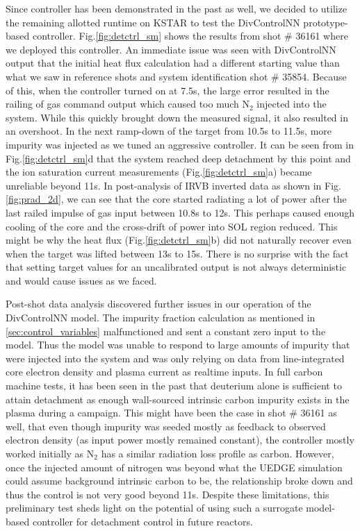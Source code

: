 Since \Afrac controller has been demonstrated in the past as well, we decided to utilize the remaining allotted runtime on KSTAR to test the DivControlNN prototype-based controller.
Fig.\ref{fig:detctrl_sm} shows the results from shot \# 36161 where we deployed this controller.
An immediate issue was seen with DivControlNN output that the initial heat flux calculation had a different starting value than what we saw in reference shots and system identification shot \# 35854.
Because of this, when the controller turned on at 7.5s, the large error resulted in the railing of gas command output which caused too much N$_2$ injected into the system.
While this quickly brought down the measured signal, it also resulted in an overshoot.
In the next ramp-down of the target from 10.5s to 11.5s, more impurity was injected as we tuned an aggressive controller.
It can be seen from \Afrac in Fig.\ref{fig:detctrl_sm}d that the system reached deep detachment by this point and the ion saturation current measurements (Fig.\ref{fig:detctrl_sm}a) became unreliable beyond 11s.
In post-analysis of IRVB inverted data as shown in Fig.\ref{fig:prad_2d}, we can see that the core started radiating a lot of power after the last railed impulse of gas input between 10.8s to 12s.
This perhaps caused enough cooling of the core and the cross-drift of power into \ac{SOL} region reduced.
This might be why the heat flux (Fig.\ref{fig:detctrl_sm}b) did not naturally recover even when the target was lifted between 13s to 15s.
There is no surprise with the fact that setting target values for an uncalibrated output is not always deterministic and would cause issues as we faced.

Post-shot data analysis discovered further issues in our operation of the DivControlNN model.
The impurity fraction calculation as mentioned in \ref{sec:control_variables} malfunctioned and sent a constant zero input to the model.
Thus the model was unable to respond to large amounts of impurity that were injected into the system and was only relying on data from line-integrated core electron density and plasma current as realtime inputs.
In full carbon machine tests, it has been seen in the past\cite{Loarte_1998_NF, Eldon_2017_NF} that deuterium alone is sufficient to attain detachment as enough wall-sourced intrinsic carbon impurity exists in the plasma during a campaign.
This might have been the case in shot \# 36161 as well, that even though impurity was seeded mostly as feedback to observed electron density (as input power mostly remained constant), the controller mostly worked initially as N$_2$ has a similar radiation loss profile as carbon.
However, once the injected amount of nitrogen was beyond what the UEDGE simulation could assume background intrinsic carbon to be, the relationship broke down and thus the control is not very good beyond 11s.
Despite these limitations, this preliminary test sheds light on the potential of using such a surrogate model-based controller for detachment control in future reactors.
